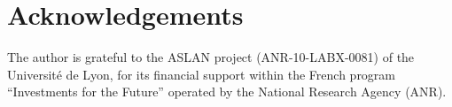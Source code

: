 \documentclass[output=paper]{langscibook}
\begin{document}
\section*{Acknowledgements}
The author is grateful to the ASLAN project (ANR-10-LABX-0081) of the Université de Lyon, for its financial support within the French program “Investments for the Future” operated by the National Research Agency (ANR).

{\sloppy\printbibliography[heading=subbibliography, notkeyword=this]}
\end{document}
